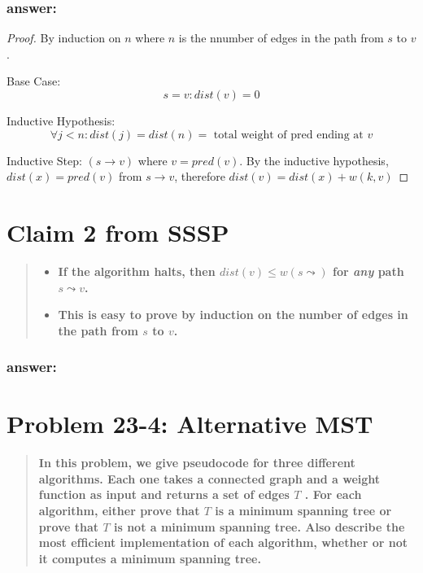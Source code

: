 \documentclass[titlepage]{article}
\theoremstyle{definition}
\begin{document}
  \subsubsection{answer:}
    \begin{proof}
      By induction on $n$ where $n$ is the nnumber of edges in the path from
      $s$ to $v$. 

      Base Case: 
      \[ s = v: dist(v) = 0 \]

      Inductive Hypothesis:
      \[ \forall j < n: dist(j) = dist(n) = \text{ total weight of pred ending at } v \]

      Inductive Step:
      $(s \rightarrow v)$ where $v = pred(v)$. By the inductive hypothesis,
      $dist(x) = pred(v)$ from $s \rightarrow v$, therefore $dist(v) = dist(x) +
      w(k,v)$
    \end{proof}




\section{Claim 2 from SSSP}
\begin{quote}
\begin{itemize}
  \item \textbf{ If the algorithm halts, then $dist(v) \leq w(s \leadsto )$
	  for \emph{any} path $s \leadsto v$.}
  \item \textbf{This is easy to prove by induction on the number of edges in
	the path from $s$ to $v$.}
\end{itemize}
\end{quote}
\subsubsection{answer:}



\section{Problem 23-4: Alternative MST}

\begin{quote}
  \textbf{ In this problem, we give pseudocode for three different algorithms.
	Each one takes a connected graph and a weight function as input and returns
	a set of edges $T$ .  For each algorithm, either prove that $T$ is a
	minimum spanning tree or prove that $T$ is not a minimum spanning tree.
	Also describe the most efﬁcient implementation of each algorithm, whether or
	not it computes a minimum spanning tree.  }
\end{quote}
\end{document}
